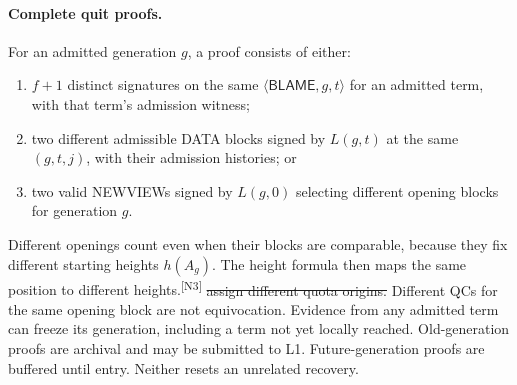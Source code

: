 \documentclass[11pt,a4paper]{article}
\newcommand{\NEW}[1]{{\color{diffNew}#1}}
\newcommand{\DEL}[1]{{\color{diffDel}\sout{#1}}}
\newcommand{\CH}[1]{\textsuperscript{\color{diffNew}\sffamily\scriptsize[#1]}}
\newcommand{\NEW}[1]{#1}
\newcommand{\DEL}[1]{}
\newcommand{\CH}[1]{}
\newcommand{\tagg}[1]{\ensuremath{\mathsf{#1}}}
\begin{document}
\paragraph{Complete quit proofs.}
For an admitted generation $g$, a proof consists of either:
\begin{enumerate}[label=(\alph*)]
\item $f+1$ distinct signatures on the same $\langle\tagg{BLAME},g,t\rangle$
for an admitted term\NEW{, with that term's admission witness};
\item two different admissible DATA blocks signed by $L(g,t)$ at the same
$(g,t,j)$, with their admission histories; or
\item two valid NEWVIEWs signed by $L(g,0)$ selecting different opening
blocks for generation $g$.
\end{enumerate}
Different openings count even when their blocks are comparable, because
they \NEW{fix different starting heights $h(A_g)$. The height formula then
maps the same position to different heights.}\CH{N3}
\DEL{assign different quota origins.}
Different QCs for the same opening block are not equivocation. Evidence
from any admitted term can freeze its generation, including a term not yet
locally reached. Old-generation proofs are archival and may be submitted to
L1. Future-generation proofs are buffered until entry. Neither resets an
unrelated recovery.
\end{document}
